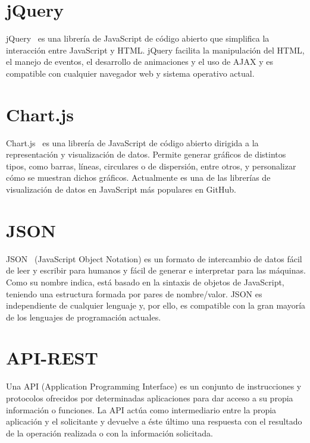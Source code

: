 \documentclass[a4paper, 12pt]{book}
\begin{document}
\section{jQuery} 
\label{sec:jquery}

jQuery~\cite{jquery} es una librería de JavaScript de código abierto que simplifica la interacción entre JavaScript y HTML. jQuery facilita la manipulación del HTML, el manejo de eventos, el desarrollo de animaciones y el uso de AJAX y es compatible con cualquier navegador web y sistema operativo actual.

\section{Chart.js} 
\label{sec:chartjs}

Chart.js~\cite{chartjs} es una librería de JavaScript de código abierto dirigida a la representación y visualización de datos. Permite generar gráficos de distintos tipos, como barras, líneas, circulares o de dispersión, entre otros, y personalizar cómo se muestran dichos gráficos.
Actualmente es una de las librerías de visualización de datos en JavaScript más populares en GitHub.

\section{JSON} 
\label{sec:json}

JSON~\cite{json} (JavaScript Object Notation) es un formato de intercambio de datos fácil de leer y escribir para humanos y fácil de generar e interpretar para las máquinas. Como su nombre indica, está basado en la sintaxis de objetos de JavaScript, teniendo una estructura formada por pares de nombre/valor.
JSON es independiente de cualquier lenguaje y, por ello, es compatible con la gran mayoría de los lenguajes de programación actuales.

\section{API-REST} 
\label{sec:api}

Una API (Application Programming Interface) es un conjunto de instrucciones y protocolos ofrecidos por determinadas aplicaciones para dar acceso a su propia información o funciones. La API actúa como intermediario entre la propia aplicación y el solicitante y devuelve a éste último una respuesta con el resultado de la operación realizada o con la información solicitada.
\end{document}
